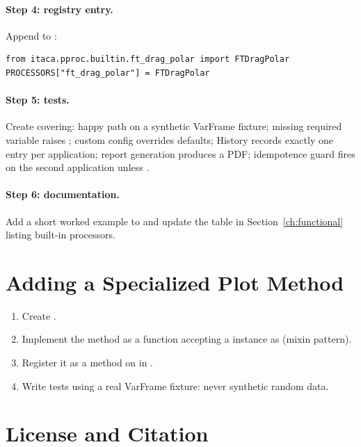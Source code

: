 \paragraph{Step 4: registry entry.} Append to
:
\begin{lstlisting}
from itaca.pproc.builtin.ft_drag_polar import FTDragPolar
PROCESSORS["ft_drag_polar"] = FTDragPolar
\end{lstlisting}

\paragraph{Step 5: tests.} Create
 covering: happy path on a
synthetic VarFrame fixture; missing required variable raises
; custom config overrides defaults;
History records exactly one entry per application; report generation
produces a PDF; idempotence guard fires on the second application unless
.

\paragraph{Step 6: documentation.} Add a short worked example to
 and update the table in
Section~\ref{ch:functional} listing built-in processors.

\section{Adding a Specialized Plot Method}

\begin{enumerate}[noitemsep,topsep=2pt]
  \item Create .
  \item Implement the method as a function accepting a 
    instance as  (mixin pattern).
  \item Register it as a method on  in
    .
  \item Write tests using a real VarFrame fixture: never synthetic
    random data.
\end{enumerate}

\section{License and Citation}


